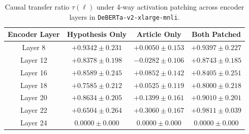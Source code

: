 \begin{table}[htbp]
\centering
\small
\begin{tabular}{cccc}
\toprule
\textbf{Encoder Layer} & \textbf{Hypothesis Only} & \textbf{Article Only} & \textbf{Both Patched} \\
\midrule
Layer 8  & $+0.9342 \pm 0.231$ & $+0.0050 \pm 0.153$ & $+0.9397 \pm 0.227$ \\
Layer 12 & $+0.8378 \pm 0.198$ & $-0.0282 \pm 0.106$ & $+0.8743 \pm 0.185$ \\
Layer 16 & $+0.8589 \pm 0.245$ & $+0.0852 \pm 0.142$ & $+0.8405 \pm 0.251$ \\
Layer 18 & $+0.7585 \pm 0.212$ & $+0.0525 \pm 0.119$ & $+0.8000 \pm 0.218$ \\
Layer 20 & $+0.8634 \pm 0.205$ & $+0.1399 \pm 0.161$ & $+0.9010 \pm 0.201$ \\
Layer 22 & $+0.6504 \pm 0.264$ & $\mathbf{+0.3060 \pm 0.167}$ & $\mathbf{+0.9811 \pm 0.039}$ \\
Layer 24 & $0.0000 \pm 0.000$ & $0.0000 \pm 0.000$ & $0.0000 \pm 0.000$ \\
\bottomrule
\end{tabular}
\caption{Causal transfer ratio $\tau(\ell)$ under 4-way activation patching across encoder layers in \texttt{DeBERTa-v2-xlarge-mnli}.}
\label{tab:activation_patching_matrix}
\end{table}

